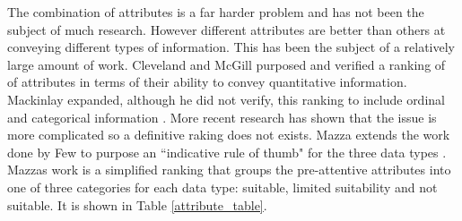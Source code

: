 \documentclass[a4paper, 11pt, titlepage, onehalfspacing]{report}
\begin{document}
The combination of attributes is a far harder problem and has not been the subject of much research. However different attributes are better than others at conveying different types of information. This has been the subject of a relatively large amount of work. Cleveland and McGill purposed and verified a ranking of of attributes in terms of their ability to convey quantitative information. Mackinlay expanded, although he did not verify, this ranking to include ordinal and categorical information \cite{mackinlay1986automating}. More recent research has shown that the issue is more complicated \cite{spence2001information} so a definitive raking does not exists. Mazza extends the work done by Few \cite{few2004show} to purpose an ``indicative rule of thumb" for the three data types \cite{mazza2009introduction}. Mazzas work is a simplified ranking that groups the pre-attentive attributes into one of three categories for each data type: suitable, limited suitability and not suitable. It is shown in Table \ref{attribute_table}.
\end{document}
